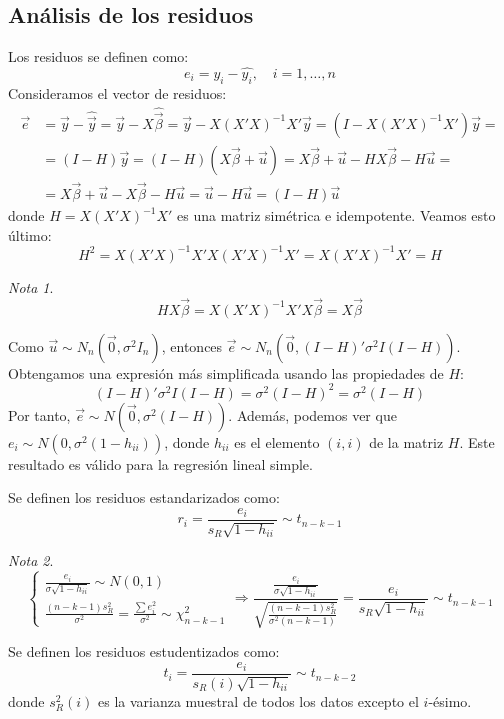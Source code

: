 \documentclass{report}
\theoremstyle{remark}
\theoremstyle{remark}
\newtheorem*{note}{Nota}
\theoremstyle{remark}
\theoremstyle{definition}
\theoremstyle{definition}
\theoremstyle{definition}
\begin{document}
\subsection*{Análisis de los residuos}
Los residuos se definen como:
$$e_i = y_i - \hat{y_i}, \quad i = 1, \dots, n$$
Consideramos el vector de residuos:
\begin{align*}
    \vec{e} & = \vec{y} - \hat{\vec{y}} = \vec{y} - X\hat{\vec{\beta}} = \vec{y} - X(X'X)^{-1}X'\vec{y} = (I - X(X'X)^{-1}X')\vec{y} = \\
            & = (I-H)\vec{y} = (I-H)(X\vec{\beta}+\vec{u}) = X\vec{\beta} + \vec{u} - HX\vec{\beta} - H\vec{u} =                       \\
            & = X\vec{\beta} + \vec{u} - X\vec{\beta} - H\vec{u} = \vec{u} - H\vec{u} = (I-H)\vec{u}
\end{align*}
donde $H = X(X'X)^{-1}X'$ es una matriz simétrica e idempotente.
Veamos esto último:
$$H^2 = X(X'X)^{-1}X'X(X'X)^{-1}X' = X(X'X)^{-1}X' = H$$

\begin{note}
    $$HX\vec{\beta} = X(X'X)^{-1}X'X\vec{\beta} = X\vec{\beta}$$
\end{note}

Como $\vec{u} \sim N_n(\vec{0}, \sigma^2I_n)$, entonces $\vec{e} \sim N_n(\vec{0}, (I-H)'\sigma^2I(I-H))$.
Obtengamos una expresión más simplificada usando las propiedades de $H$:
$$(I-H)'\sigma^2I(I-H) = \sigma^2(I-H)^2 = \sigma^2(I-H)$$
Por tanto, $\vec{e} \sim N(\vec{0}, \sigma^2(I-H))$.
Además, podemos ver que $e_i \sim N(0, \sigma^2(1-h_{ii}))$, donde $h_{ii}$ es el elemento $(i,i)$ de la matriz $H$.
Este resultado es válido para la regresión lineal simple.

Se definen los residuos estandarizados como:
$$r_i = \frac{e_i}{s_R\sqrt{1-h_{ii}}} \sim t_{n-k-1}$$

\begin{note}
    $$\begin{cases}
            \frac{e_i}{\sigma\sqrt{1-h_{ii}}} \sim N(0, 1) \\
            \frac{(n-k-1)s_R^2}{\sigma^2} = \frac{\sum e_i^2}{\sigma^2} \sim \chi^2_{n-k-1}
        \end{cases} \Rightarrow
        \frac{\frac{e_i}{\sigma\sqrt{1-h_{ii}}}}{\sqrt{\frac{(n-k-1)s_R^2}{\sigma^2(n-k-1)}}} = \frac{e_i}{s_R\sqrt{1-h_{ii}}} \sim t_{n-k-1}$$
\end{note}

Se definen los residuos estudentizados como:
$$t_i = \frac{e_i}{s_R(i)\sqrt{1-h_{ii}}} \sim t_{n-k-2}$$
donde $s_R^2(i)$ es la varianza muestral de todos los datos excepto el $i$-ésimo.
\end{document}
